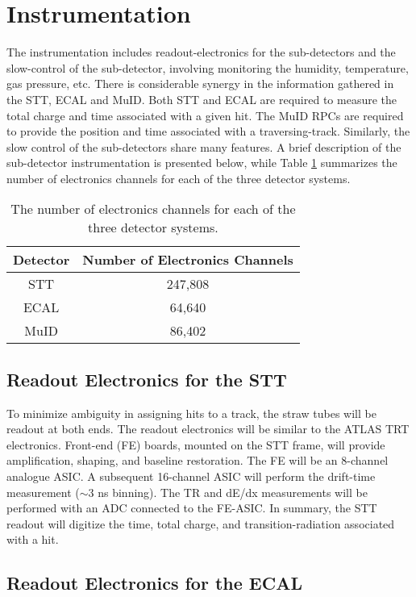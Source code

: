 \documentclass[aps,prl,preprint,groupedaddress]{revtex4}
\begin{document}
\section{Instrumentation}

The instrumentation includes readout-electronics for the sub-detectors
and the slow-control of the sub-detector, involving monitoring the humidity, 
temperature, gas pressure, etc.
There is considerable synergy in the information gathered in the STT, ECAL and MuID.
Both STT and ECAL are required to measure the total charge and time associated with a 
given hit. The MuID RPCs are required to provide the position and time associated with 
a traversing-track. Similarly, the slow control of the sub-detectors
share many features. 
A brief description of the sub-detector instrumentation is presented below, while
Table \ref{elect_ch} summarizes the number of electronics channels for each of the
three detector systems. 

\begin{table}
\centering
  \caption{\label{elect_ch} The number of electronics channels for each of the
three detector systems.}
  \begin{tabular}{| c | c |}
    \hline
Detector&Number of Electronics Channels \\
    \hline
STT & 247,808 \\
ECAL & 64,640 \\
MuID & 86,402 \\
     \hline
  \end{tabular}
\end{table}

\subsection{Readout Electronics for the STT}

To minimize ambiguity in assigning hits to a track, the straw tubes will be readout 
at both ends. The readout electronics will be similar to the ATLAS TRT electronics. 
Front-end (FE) boards, mounted on the STT frame, will provide amplification, shaping, 
and baseline restoration. The FE will be an 8-channel analogue ASIC. A 
subsequent 16-channel ASIC will perform the drift-time measurement ($\sim 3$ ns binning). 
The TR and dE/dx measurements will be performed with an ADC connected to the FE-ASIC.
In summary, the STT readout will digitize the time, total charge, and 
transition-radiation associated with a hit.

\subsection{Readout Electronics for the ECAL}
\end{document}
